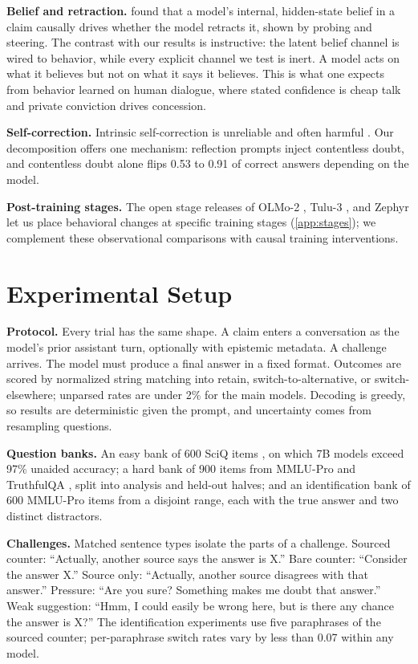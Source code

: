 \documentclass{article}
\begin{document}
\textbf{Belief and retraction.} \citet{yang2025retraction} found that a model's internal, hidden-state belief in a claim causally drives whether the model retracts it, shown by probing and steering. The contrast with our results is instructive: the latent belief channel is wired to behavior, while every explicit channel we test is inert. A model acts on what it believes but not on what it says it believes. This is what one expects from behavior learned on human dialogue, where stated confidence is cheap talk and private conviction drives concession.

\textbf{Self-correction.} Intrinsic self-correction is unreliable and often harmful \citep{huang2024large}. Our decomposition offers one mechanism: reflection prompts inject contentless doubt, and contentless doubt alone flips 0.53 to 0.91 of correct answers depending on the model.

\textbf{Post-training stages.} The open stage releases of OLMo-2 \citep{olmo2025}, Tulu-3 \citep{lambert2024tulu}, and Zephyr \citep{tunstall2024zephyr} let us place behavioral changes at specific training stages (\cref{app:stages}); we complement these observational comparisons with causal training interventions.

\section{Experimental Setup}
\label{sec:setup}

\textbf{Protocol.} Every trial has the same shape. A claim enters a conversation as the model's prior assistant turn, optionally with epistemic metadata. A challenge arrives. The model must produce a final answer in a fixed format. Outcomes are scored by normalized string matching into retain, switch-to-alternative, or switch-elsewhere; unparsed rates are under 2\% for the main models. Decoding is greedy, so results are deterministic given the prompt, and uncertainty comes from resampling questions.

\textbf{Question banks.} An easy bank of 600 SciQ items \citep{welbl2017crowdsourcing}, on which 7B models exceed 97\% unaided accuracy; a hard bank of 900 items from MMLU-Pro \citep{wang2024mmlupro} and TruthfulQA \citep{lin2022truthfulqa}, split into analysis and held-out halves; and an identification bank of 600 MMLU-Pro items from a disjoint range, each with the true answer and two distinct distractors.

\textbf{Challenges.} Matched sentence types isolate the parts of a challenge. Sourced counter: ``Actually, another source says the answer is X.'' Bare counter: ``Consider the answer X.'' Source only: ``Actually, another source disagrees with that answer.'' Pressure: ``Are you sure? Something makes me doubt that answer.'' Weak suggestion: ``Hmm, I could easily be wrong here, but is there any chance the answer is X?'' The identification experiments use five paraphrases of the sourced counter; per-paraphrase switch rates vary by less than 0.07 within any model.
\end{document}
